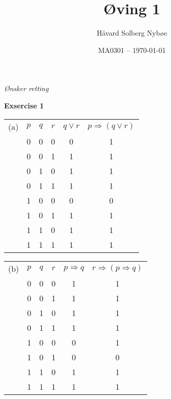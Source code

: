\documentclass[a4paper, 12pt]{article}  %
\title{Øving 1}                         %
\author{Håvard Solberg Nybøe}           %
\date{MA0301 -- \today}                 %
\begin{document}
\maketitle

\emph{Ønsker retting}

\textbf{Exsercise 1}
\begin{table}[H]
    \begin{tabular}[H]{c|c|c|c|c|c|}
        (a) & $p$ & $q$ & $r$ & $q \lor r$ & $p \Rightarrow (q \lor r)$ \\
            & 0   & 0   & 0   & 0          & 1                          \\
            & 0   & 0   & 1   & 1          & 1                          \\
            & 0   & 1   & 0   & 1          & 1                          \\
            & 0   & 1   & 1   & 1          & 1                          \\
            & 1   & 0   & 0   & 0          & 0                          \\
            & 1   & 0   & 1   & 1          & 1                          \\
            & 1   & 1   & 0   & 1          & 1                          \\
            & 1   & 1   & 1   & 1          & 1                          \\
    \end{tabular}
\end{table}

\begin{table}[H]
    \begin{tabular}[H]{c|c|c|c|c|c|}
        (b) & $p$ & $q$ & $r$ & $p \Rightarrow q$ & $r \Rightarrow (p \Rightarrow q)$ \\
            & 0   & 0   & 0   & 1                 & 1                                 \\
            & 0   & 0   & 1   & 1                 & 1                                 \\
            & 0   & 1   & 0   & 1                 & 1                                 \\
            & 0   & 1   & 1   & 1                 & 1                                 \\
            & 1   & 0   & 0   & 0                 & 1                                 \\
            & 1   & 0   & 1   & 0                 & 0                                 \\
            & 1   & 1   & 0   & 1                 & 1                                 \\
            & 1   & 1   & 1   & 1                 & 1                                 \\
    \end{tabular}
\end{table}
\end{document}
